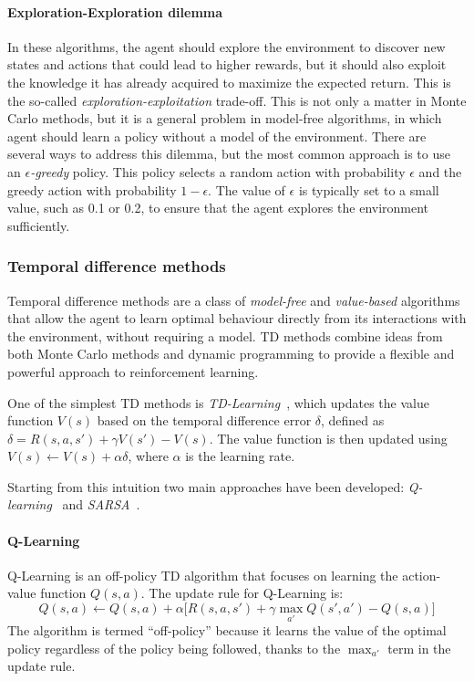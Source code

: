 \paragraph*{Exploration-Exploration dilemma}
In these algorithms, the agent should explore the environment to discover new states and actions that could lead to higher rewards,
  but it should also exploit the knowledge it has already acquired to maximize the expected return.
  This is the so-called \emph{exploration-exploitation} trade-off.
  This is not only a matter in Monte Carlo methods, but it is a general problem in model-free algorithms, in which agent should learn a policy without a model of the environment.
%
There are several ways to address this dilemma, 
 but the most common approach is to use an \emph{$\epsilon$-greedy} policy. 
 This policy selects a random action with probability \(\epsilon\) and the greedy action with probability \(1 - \epsilon\). 
 The value of \(\epsilon\) is typically set to a small value, 
 such as 0.1 or 0.2, 
 to ensure that the agent explores the environment sufficiently.
%

\subsubsection{Temporal difference methods}
Temporal difference methods are a class of \emph{model-free} and \emph{value-based} algorithms 
 that allow the agent to learn optimal behaviour directly from its interactions with the environment, without requiring a model. 
 TD methods combine ideas from both Monte Carlo methods and dynamic programming to provide a flexible and powerful approach to reinforcement learning.

One of the simplest TD methods is \emph{TD-Learning}~\cite{DBLP:journals/ml/Sutton88}, 
 which updates the value function \(V(s)\) based on the temporal difference error \(\delta\), 
 defined as \( \delta = R(s, a, s') + \gamma V(s') - V(s) \). 
 The value function is then updated using \( V(s) \leftarrow V(s) + \alpha \delta \), where \(\alpha\) is the learning rate.

Starting from this intuition two main approaches have been developed: 
 \emph{Q-learning}~\cite{DBLP:journals/ml/WatkinsD92} and \emph{SARSA}~\cite{10.5555/3312046}. 

 \paragraph*{Q-Learning}

 Q-Learning is an off-policy TD algorithm that focuses on learning the action-value function \(Q(s, a)\). The update rule for Q-Learning is:
 \begin{equation}
 Q(s, a) \leftarrow Q(s, a) + \alpha \Big[ R(s, a, s') + \gamma \max_{a'} Q(s', a') - Q(s, a) \Big]
 \end{equation}
 The algorithm is termed ``off-policy'' because it learns the value of the optimal policy regardless of the policy being followed, 
  thanks to the \(\max_{a'}\) term in the update rule.
 

